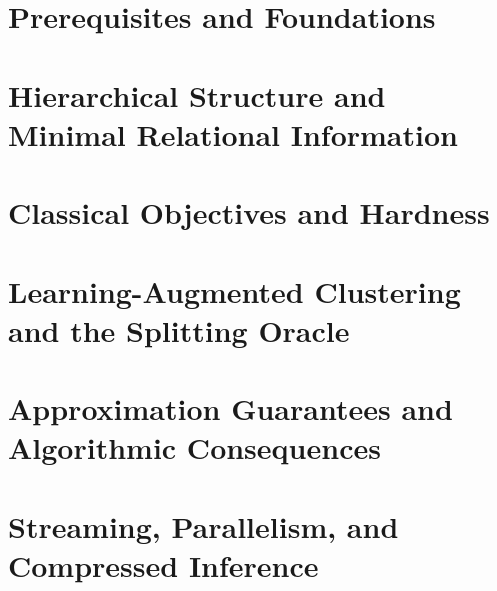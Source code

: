 \documentclass[11pt, twoside, openright]{book}
\theoremstyle{plain}
\theoremstyle{definition}
\theoremstyle{remark}
\begin{document}
\frontmatter


\tableofcontents
\listoffigures

\mainmatter

\part{Prerequisites and Foundations}







\part{Hierarchical Structure and Minimal Relational Information}





\part{Classical Objectives and Hardness}



\part{Learning-Augmented Clustering and the Splitting Oracle}




\part{Approximation Guarantees and Algorithmic Consequences}



\part{Streaming, Parallelism, and Compressed Inference}


\end{document}
